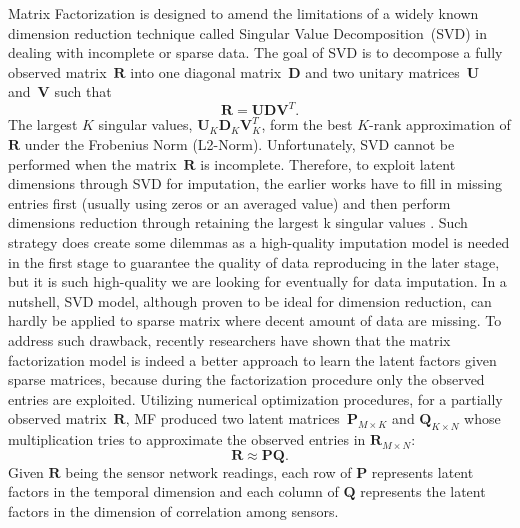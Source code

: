 Matrix Factorization is designed to amend the limitations of a widely known dimension reduction technique called Singular Value Decomposition~(SVD) in dealing with incomplete or sparse data.
The goal of SVD is to decompose a fully observed matrix~$\mathbf{R}$ into one diagonal matrix~$\mathbf{D}$ and two unitary matrices~$\mathbf{U}$ and~$\mathbf{V}$ such that
\begin{equation*} \mathbf{R} = \mathbf{U}\mathbf{D}\mathbf{V}^T. \end{equation*}
The largest $K$ singular values, $\mathbf{U}_K \mathbf{D}_K \mathbf{V}_K^T$, form the best $K$-rank approximation of $\mathbf{R}$ under the Frobenius Norm (L2-Norm). Unfortunately, SVD cannot be performed when the matrix~$\mathbf{R}$ is incomplete. Therefore, to exploit latent dimensions through SVD for imputation, the earlier works have to fill in missing entries first (usually using zeros or an averaged value) and then perform dimensions reduction through retaining the largest k singular values \cite{beckers2003eof, alvera2009enhancing}. Such strategy does create some dilemmas as a high-quality imputation model is needed in the first stage to guarantee the quality of data reproducing in the later stage, but it is such high-quality we are looking for eventually for data imputation. In a nutshell, SVD model, although proven to be ideal for dimension reduction, can hardly be applied to sparse matrix where decent amount of data are missing.
To address such drawback, recently researchers have shown \cite{koren2009matrix} that the matrix factorization model is indeed a better approach to learn the latent factors given sparse matrices, because during the factorization procedure only the observed entries are exploited.
Utilizing numerical optimization procedures, for a partially observed matrix~$\mathbf{R}$, MF produced two latent matrices~$\mathbf{P}_{M \times K}$ and $\mathbf{Q}_{K \times N}$ whose multiplication tries to approximate the observed entries in $\mathbf{R}_{M \times N}$:
\begin{equation*}\mathbf{R} \approx \mathbf{P} \mathbf{Q}.\end{equation*}
Given $\mathbf{R}$ being the sensor network readings, each row of $\mathbf{P}$ represents latent factors in the temporal dimension and each column of $\mathbf{Q}$ represents the latent factors in the dimension of correlation among sensors.

